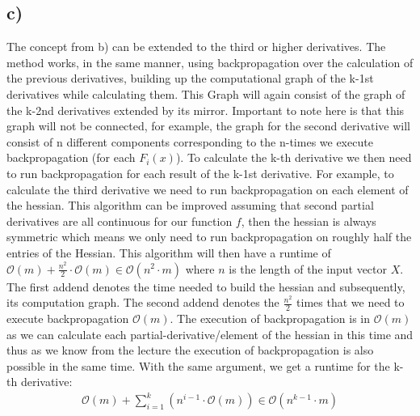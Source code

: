\documentclass[a4paper,12pt]{ETHexercise}
\begin{document}
\subsection*{c)}
The concept from b) can be extended to the third or higher derivatives. The method works, in the same manner, using backpropagation over the calculation of the previous derivatives, building up the computational graph of the k-1st derivatives while calculating them. This Graph will again consist of the graph of the k-2nd derivatives extended by its mirror. Important to note here is that this graph will not be connected, for example, the graph for the second derivative will consist of n different components corresponding to the n-times we execute backpropagation (for each $F_i(x)$). To calculate the k-th derivative we then need to run backpropagation for each result of the k-1st derivative. For example, to calculate the third derivative we need to run backpropagation on each element of the hessian. This algorithm can be improved assuming that second partial derivatives are all continuous for our function $f$, then the hessian is always symmetric which means we only need to run backpropagation on roughly half the entries of the Hessian. This algorithm will then have a runtime of $\mathcal{O}(m)+ \frac{n^2}{2} \cdot \mathcal{O}(m) \in  \mathcal{O}(n^2 \cdot m)$ where $n$ is the length of the input vector $X$. The first addend denotes the time needed to build the hessian and subsequently, its computation graph. The second addend denotes the $\frac{n^2}{2}$ times that we need to execute backpropagation $\mathcal{O}(m)$. The execution of backpropagation is in $\mathcal{O}(m)$ as we can calculate each partial-derivative/element of the hessian in this time and thus as we know from the lecture the execution of backpropagation is also possible in the same time.
With the same argument, we get a runtime for the k-th derivative:
\begin{align}
   \mathcal{O}(m) + \sum_{i = 1}^{k}(n^{i-1}\cdot \mathcal{O}(m)) \in \mathcal{O}(n^{k-1} \cdot m)
\end{align}
\end{document}
